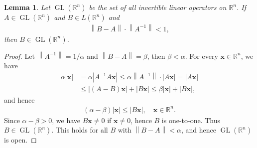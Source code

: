 \documentclass[11pt]{book}
\newtheorem{lemma}{Lemma}[chapter]
\theoremstyle{definition}
\numberwithin{equation}{chapter}
\begin{document}
\begin{lemma}\label{lemma_71}
Let $\operatorname{GL}(\mathbb{R}^n)$ be the set of all invertible linear operators on $\mathbb{R}^n$. If $A \in \operatorname{GL}(\mathbb{R}^n)$ and $B \in L(\mathbb{R}^n)$ and 
\begin{align*}
    \left\|B - A\right\| \cdot \left\|A^{-1}\right\| < 1,
\end{align*}
then $B \in \operatorname{GL}(\mathbb{R}^n)$.
\end{lemma}
\begin{proof}
Let $\left\|A^{-1}\right\| = 1/\alpha$ and $\left\|B - A\right\| = \beta$, then $\beta < \alpha$. For every $\mathbf{x} \in \mathbb{R}^n$, we have
\begin{align*}
    \alpha \left|\mathbf{x}\right| & = \alpha \left|A^{-1} A \mathbf{x}\right| \leq \alpha \left\|A^{-1}\right\| \cdot \left|A\mathbf{x}\right| = \left|A\mathbf{x}\right| \\
    & \leq \left|(A - B)\mathbf{x}\right| + \left|B\mathbf{x}\right| \leq \beta \left|\mathbf{x}\right| + \left|B\mathbf{x}\right|,
\end{align*}
and hence
\begin{align}\label{lemma_71_equ1}
    (\alpha - \beta)\left|\mathbf{x} \right| \leq \left|B\mathbf{x}\right|, \quad \mathbf{x} \in \mathbb{R}^n.
\end{align}
Since $\alpha - \beta > 0$, we have $B\mathbf{x} \neq 0$ if $\mathbf{x} \neq 0$, hence $B$ is one-to-one. Thus $B \in \operatorname{GL}(\mathbb{R}^n)$. This holds for all $B$ with $\left\|B - A\right\| < \alpha$, and hence $\operatorname{GL}(\mathbb{R}^n)$ is open.
\end{proof}

\medskip
\end{document}
